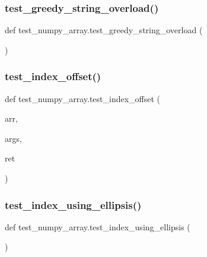 \subsubsection{\texorpdfstring{test\_greedy\_string\_overload()}{test\_greedy\_string\_overload()}}
{\footnotesize\ttfamily def test\+\_\+numpy\+\_\+array.\+test\+\_\+greedy\+\_\+string\+\_\+overload (\begin{DoxyParamCaption}{ }\end{DoxyParamCaption})}

 \mbox{\label{namespacetest__numpy__array_a793fa554a6ac5ce485f8a824718a71ba}} 
\subsubsection{\texorpdfstring{test\_index\_offset()}{test\_index\_offset()}}
{\footnotesize\ttfamily def test\+\_\+numpy\+\_\+array.\+test\+\_\+index\+\_\+offset (\begin{DoxyParamCaption}\item[{}]{arr,  }\item[{}]{args,  }\item[{}]{ret }\end{DoxyParamCaption})}

\mbox{\label{namespacetest__numpy__array_af7699d7ad6a15677a3cd5557287e0b53}} 
\subsubsection{\texorpdfstring{test\_index\_using\_ellipsis()}{test\_index\_using\_ellipsis()}}
{\footnotesize\ttfamily def test\+\_\+numpy\+\_\+array.\+test\+\_\+index\+\_\+using\+\_\+ellipsis (\begin{DoxyParamCaption}{ }\end{DoxyParamCaption})}

